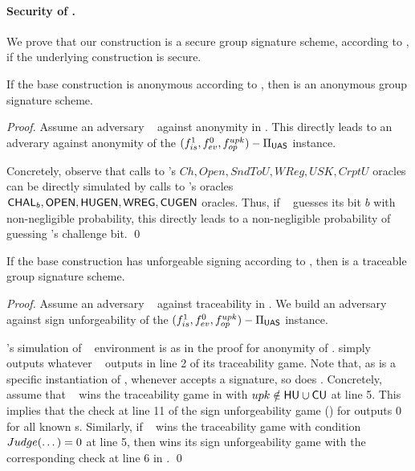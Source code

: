 \paragraph{Security of \CUASGS.} %
We prove that our \CUASGS construction is a secure group signature scheme,
according to \cite{bsz05}, if the underlying \CUASGen construction is secure.

\begin{theorem}
  If the base \CUASGen construction is anonymous according to
  , then \CUASRing is an anonymous group signature
  scheme.
\end{theorem}


\begin{proof}
  Assume an adversary \adv~ against anonymity in \CUASGS. This directly leads
  to an adverary \advB against anonymity of the $(f_{is}^1,f_{ev}^0,
  f_{op}^{upk})-\Pi_{\mathsf{UAS}}$ instance.

  Concretely, observe that calls to \adv's $Ch,Open,SndToU,WReg,USK,CrptU$
  oracles can be directly simulated by calls to \advB's oracles $\mathsf{CHAL}_b,
  \mathsf{OPEN},\mathsf{HUGEN},\mathsf{WREG},\mathsf{CUGEN}$ oracles. Thus, if \adv~ guesses its bit $b$
  with non-negligible probability, this directly leads to a non-negligible
  probability of guessing \advB's challenge bit.
  \qed
\end{proof}

\begin{theorem}
  If the base \CUASGen construction has unforgeable signing according to
  , then \CUASGS is a traceable group signature
  scheme.
\end{theorem}

\begin{proof}
  Assume an adversary \adv~ against traceability in \CUASGS. We build an
  adversary \advB against sign unforgeability of the $(f_{is}^1,f_{ev}^0,
  f_{op}^{upk})-\Pi_{\mathsf{UAS}}$ instance.

  \advB's simulation of \adv~ environment is as in the proof for anonymity
  of \CUASGS. \advB simply outputs whatever \adv~ outputs in line 2 of its
  traceability game. Note that, as \CUASGS is a specific instantiation of
  \CUASGen, whenever \CUASGS accepts a signature, so does \CUASGen. Concretely,
  assume that \adv~ wins the traceability game in  with
  $upk \notin \mathsf{HU} \cup \mathsf{CU}$ at line 5. This implies that the check at line 11
  of the sign unforgeability game () for \CUASGen
  outputs $0$ for all known {\uid}s. Similarly, if \adv~ wins the traceability
  game with condition $Judge(\dots)=0$ at line 5, then \advB wins its sign
  unforgeability game with the corresponding check at line 6 in
  .
  \qed
\end{proof}


